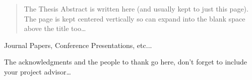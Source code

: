 \documentclass[
11pt, %
oneside, %
english, %
singlespacing, %
headsepline, %
]{MastersDoctoralThesis} %
\begin{document}
\cleardoublepage


%
%


\begin{abstract}
	\addchaptertocentry{\abstractname} %

	The Thesis Abstract is written here (and usually kept to just this page). The page is kept centered vertically so can expand into the blank space above the title too\ldots

\end{abstract}


\begin{publications}
	\addchaptertocentry{\publicationsname} %

	Journal Papers, Conference Presentations, etc...

\end{publications}


\begin{acknowledgements}
	\addchaptertocentry{\acknowledgementname} %

	The acknowledgments and the people to thank go here, don't forget to include your project advisor\ldots

\end{acknowledgements}
\end{document}
